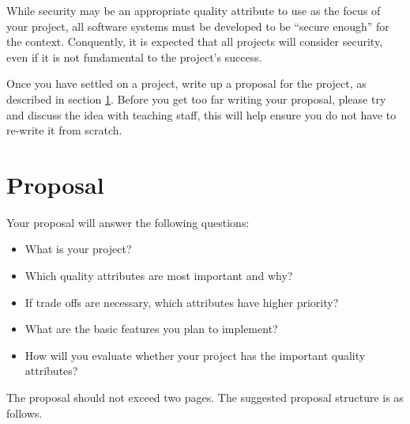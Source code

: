 \documentclass{csse4400}
\begin{document}
\noindent
While security may be an appropriate quality attribute to use as the focus of your project,
all software systems must be developed to be ``secure enough'' for the context.
Conquently, it is expected that all projects will consider security,
even if it is not fundamental to the project's success.

Once you have settled on a project, write up a proposal for the project, as described in section \ref{sect:proposal}.
Before you get too far writing your proposal,
please try and discuss the idea with teaching staff,
this will help ensure you do not have to re-write it from scratch.


\section{Proposal}\label{sect:proposal}
Your proposal will answer the following questions:
\begin{itemize}
    \item What is your project?
    \item Which quality attributes are most important and why?
    \item If trade offs are necessary, which attributes have higher priority?
    \item What are the basic features you plan to implement?
    \item How will you evaluate whether your project has the important quality attributes?
\end{itemize}

\noindent
The proposal should not exceed two pages.
The suggested proposal structure is as follows.
\end{document}
